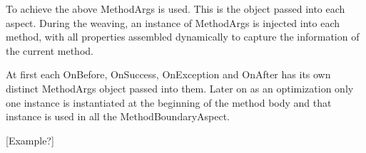 To achieve the above MethodArgs is used. This is the object passed into each aspect. During the weaving, an instance of MethodArgs is injected into each method, with all properties assembled dynamically to capture the information of the current method.

At first each OnBefore, OnSuccess, OnException and OnAfter has its own distinct MethodArgs object passed into them. Later on as an optimization only one instance is instantiated at the beginning of the method body and that instance is used in all the MethodBoundaryAspect.

[Example?]
%



%
